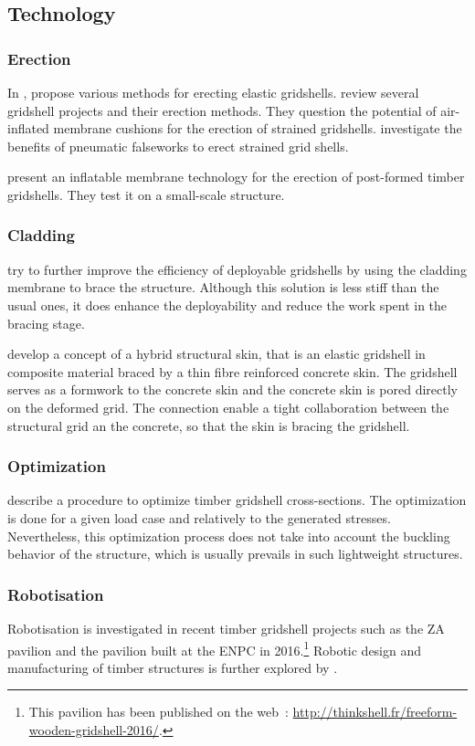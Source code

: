 \subsection{Technology}

\subsubsection{Erection}
In ,  propose various methods for erecting elastic gridshells.
 review several gridshell projects and their erection methods. They question the potential of air-inflated membrane cushions for the erection of strained gridshells.  investigate the benefits of pneumatic falseworks to erect strained grid shells.

 present an inflatable membrane technology for the erection of post-formed timber gridshells. They test it on a small-scale structure.

\subsubsection{Cladding}
 try to further improve the efficiency of deployable gridshells by using the cladding membrane to brace the structure. Although this solution is less stiff than the usual ones, it does enhance the deployability and reduce the work spent in the bracing stage.

 develop a concept of a hybrid structural skin, that is an elastic gridshell in composite material braced by a thin fibre reinforced concrete skin. The gridshell serves as a formwork to the concrete skin and the concrete skin is pored directly on the deformed grid. The connection enable a tight collaboration between the structural grid an the concrete, so that the skin is bracing the gridshell.

\subsubsection{Optimization}
 describe a procedure to optimize timber gridshell cross-sections. The  optimization is done for a given load case and relatively to the generated stresses. Nevertheless, this optimization process does not take into account the buckling behavior of the structure, which is usually prevails in such lightweight structures. 

\subsubsection{Robotisation}
Robotisation is investigated in recent timber gridshell projects such as the ZA pavilion \cite{Mork2016} and the pavilion built at the ENPC in 2016.\footnote{This pavilion has been published on the web~: \url{http://thinkshell.fr/freeform-wooden-gridshell-2016/}.} Robotic design and manufacturing of timber structures is further explored by .

